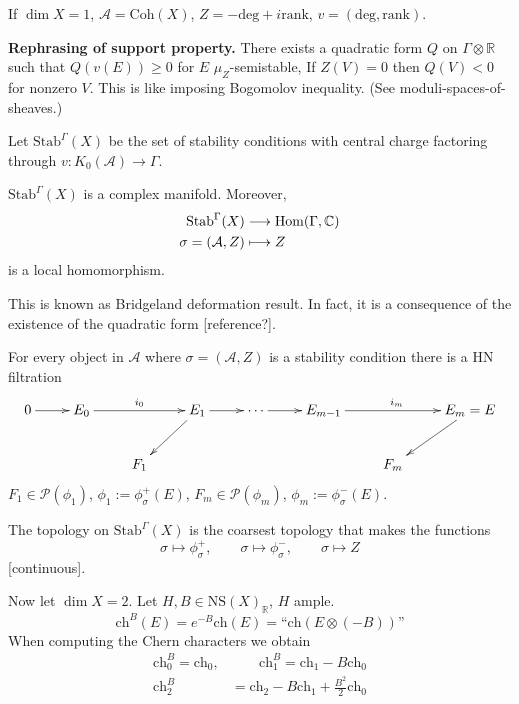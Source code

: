 \begin{exercise}
\label{exercise-coherent-sheaves-stability-condition}
If $\dim X=1$, $\mathcal{A}=\text{Coh}(X)$, $Z= - \text{deg}+i \text{rank}$, 
$v=(\text{deg},\text{rank})$.
\end{exercise}

\medskip\noindent
{\bf Rephrasing of support property.} There exists a quadratic form $Q$ on
$\Gamma \otimes \mathbb{R}$ such that $Q(v(E))\geq 0$ for $E$
$\mu_Z$-semistable, If $Z(V)=0$ then $Q(V)<0$ for nonzero $V$.
This is like imposing Bogomolov inequality. (See moduli-spaces-of-sheaves.)

\medskip\noindent
Let $\text{Stab}^\Gamma(X)$ be the set of stability conditions with central
charge factoring through $v:K_0(\mathcal{A})\to\Gamma$.

\begin{theorem}[Bridgeland]
\label{theorem-Bridgeland}
$\text{Stab}^\Gamma(X)$ is a complex manifold. Moreover,
\begin{align*}
\text{Stab}^\Gamma(X) &\longrightarrow \mathop{\mathrm{Hom}}\nolimits(\Gamma,\mathbb{C}) \\
\sigma=(\mathcal{A},Z) &\longmapsto Z
\end{align*}
is a local homomorphism.
\end{theorem}

This is known as Bridgeland deformation result. In fact, it is a consequence of
the existence of the quadratic form [reference?].

For every object in $\mathcal{A}$ where $\sigma=(\mathcal{A},Z)$ is a stability
condition there is a HN filtration
$$
\xymatrix{
0\ar[r]&E_0\ar[rr]^{i_0}&&E_1\ar[dl]\ar[r]&\cdots\ar[r]
&E_{m-1}\ar[rr]^{i_m}&&E_m=E\ar[dl]\\
&&F_1& & & & F_m
}
$$
$F_1 \in \mathcal{P}(\phi_1)$, $\phi_1:=\phi^+_\sigma(E)$, $F_m \in
\mathcal{P}(\phi_m)$, $\phi_m:=\phi_\sigma^-(E)$.

The topology on $\text{Stab}^\Gamma(X)$ is the coarsest topology that makes the
functions
$$
\sigma \mapsto \phi^+_\sigma,\qquad \sigma \mapsto \phi^-_\sigma, \qquad 
\sigma \mapsto Z
$$
[continuous].

\medskip\noindent
Now let $\dim X=2$. Let $H,B \in \text{NS}(X)_\mathbb{R}$, $H$ ample.
$$
\text{ch}^B(E)=e^{-B}\text{ch}(E)=\text{``$\text{ch}(E\otimes (-B))$''}
$$
When computing the Chern characters we obtain
\begin{align*}
\text{ch}_0^B = \text{ch}_0,&\qquad \text{ch}_1^B=\text{ch}_1-B\text{ch}_0\\
\text{ch}_2^B&=\text{ch}_2-B\text{ch}_1+\frac{B^2}{2}\text{ch}_0 
\end{align*}

